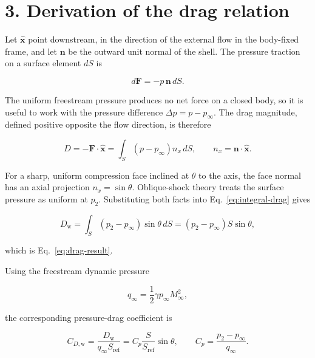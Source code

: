 \documentclass[10pt]{article}
\begin{document}
\setlength{\abovedisplayskip}{1pt plus 1pt minus 1pt}
\setlength{\belowdisplayskip}{1pt plus 1pt minus 1pt}
\setlength{\abovedisplayshortskip}{1pt plus 1pt minus 1pt}
\setlength{\belowdisplayshortskip}{1pt plus 1pt minus 1pt}

\footnotesize
\section*{3. Derivation of the drag relation}

Let $\hat{\boldsymbol{x}}$ point downstream, in the direction of the external flow in
the body-fixed frame, and let $\boldsymbol{n}$ be the outward unit normal of the shell.
The pressure traction on a surface element $dS$ is

\begin{equation}
  d\boldsymbol{F}=-p\,\boldsymbol{n}\,dS.
\end{equation}

The uniform freestream pressure produces no net force on a closed body, so it is useful
to work with the pressure difference $\Delta p=p-p_\infty$. The drag magnitude, defined
positive opposite the flow direction, is therefore

\begin{equation}
  D=-\boldsymbol{F}\cdot\hat{\boldsymbol{x}}
   =\int_S (p-p_\infty)n_x\,dS,
  \qquad n_x=\boldsymbol{n}\cdot\hat{\boldsymbol{x}}.
  \label{eq:integral-drag}
\end{equation}

For a sharp, uniform compression face inclined at $\theta$ to the axis, the face normal
has an axial projection $n_x=\sin\theta$. Oblique-shock theory treats the surface
pressure as uniform at $p_2$. Substituting both facts into Eq.~\eqref{eq:integral-drag}
gives

\begin{equation}
  D_{\mathrm w}=\int_S(p_2-p_\infty)\sin\theta\,dS
  =(p_2-p_\infty)S\sin\theta,
\end{equation}

which is Eq.~\eqref{eq:drag-result}.

Using the freestream dynamic pressure

\begin{equation}
  q_\infty=\frac{1}{2}\gamma p_\infty M_\infty^2,
\end{equation}

the corresponding pressure-drag coefficient is

\begin{equation}
  C_{D,\mathrm w}
  =\frac{D_{\mathrm w}}{q_\infty S_{\mathrm{ref}}}
  =C_p\frac{S}{S_{\mathrm{ref}}}\sin\theta,
  \qquad
  C_p=\frac{p_2-p_\infty}{q_\infty}.
  \label{eq:cd}
\end{equation}
\end{document}
